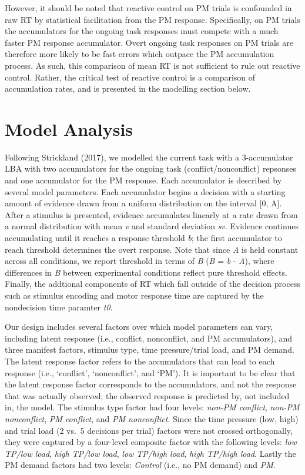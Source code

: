 \documentclass[11pt,]{article}
\begin{document}
However, it should be noted that reactive control on PM trials is
confounded in raw RT by statistical facilitation from the PM response.
Specifically, on PM trials the accumulators for the ongoing task
responses must compete with a much faster PM response accumulator. Overt
ongoing task responses on PM trials are therefore more likely to be fast
errors which outpace the PM accumulation process. As such, this
comparison of mean RT is not sufficient to rule out reactive control.
Rather, the critical test of reactive control is a comparison of
accumulation rates, and is presented in the modelling section below.

\section{Model Analysis}\label{model-analysis}

Following Strickland (2017), we modelled the current task with a
3-accumulator LBA with two accumulators for the ongoing task
(conflict/nonconflict) repsonses and one accumulator for the PM
response. Each accumulator is described by several model parameters.
Each accumulator begins a decision with a starting amount of evidence
drawn from a uniform distribution on the interval {[}0, A{]}. After a
stimulus is presented, evidence accumulates linearly at a rate drawn
from a normal distribution with mean \emph{v} and standard deviation
\emph{sv}. Evidence continues accumulating until it reaches a response
threshold \emph{b}; the first accumulator to reach threshold determines
the overt response. Note that since \emph{A} is held constant across all
conditions, we report threshold in terms of \emph{B} (\emph{B} =
\emph{b} - \emph{A}), where differences in \emph{B} between experimental
conditions reflect pure threshold effects. Finally, the addtional
components of RT which fall outside of the decision process such as
stimulus encoding and motor response time are captured by the
nondecision time paramter \emph{t0}.

Our design includes several factors over which model parameters can
vary, including latent response (i.e., conflict, nonconflict, and PM
accumulators), and three manifest factors, stimulus type, time
pressure/trial load, and PM demand. The latent response factor refers to
the accumulators that can lead to each response (i.e., `conflict',
`nonconflict', and `PM'). It is important to be clear that the latent
response factor corresponds to the accumulators, and not the response
that was actually observed; the observed response is predicted by, not
included in, the model. The stimulus type factor had four levels:
\emph{non-PM conflict}, \emph{non-PM nonconflict}, \emph{PM conflict},
and \emph{PM nonconflict}. Since the time pressure (low, high) and trial
load (2 vs.~5 decisions per trial) factors were not crossed
orthogonally, they were captured by a four-level composite factor with
the following levels: \emph{low TP/low load}, \emph{high TP/low load},
\emph{low TP/high load}, \emph{high TP/high load}. Lastly the PM demand
factors had two levels: \emph{Control} (i.e., no PM demand) and
\emph{PM}.
\end{document}
